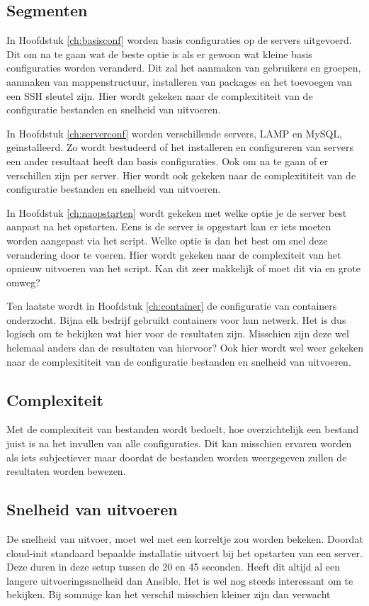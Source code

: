\subsection{Segmenten}
In Hoofdstuk \ref*{ch:basisconf} worden basis configuraties op de servers uitgevoerd. Dit om na te gaan wat de beste optie is als er gewoon wat kleine basis configuraties worden veranderd. Dit zal het aanmaken van gebruikers en groepen, aanmaken van mappenstructuur, installeren van packages en het toevoegen van een SSH sleutel zijn. Hier wordt gekeken naar de complexititeit van de configuratie bestanden en snelheid van uitvoeren.

In Hoofdstuk \ref*{ch:serverconf} worden verschillende servers, LAMP en MySQL, geïnstalleerd. Zo wordt bestudeerd of het installeren en configureren van servers een ander resultaat heeft dan basis configuraties. Ook om na te gaan of er verschillen zijn per server. Hier wordt ook gekeken naar de complexititeit van de configuratie bestanden en snelheid van uitvoeren.

In Hoofdstuk \ref*{ch:naopstarten} wordt gekeken met welke optie je de server best aanpast na het opstarten. Eens is de server is opgestart kan er iets moeten worden aangepast via het script. Welke optie is dan het best om snel deze verandering door te voeren. Hier wordt gekeken naar de complexiteit van het opnieuw uitvoeren van het script. Kan dit zeer makkelijk of moet dit via en grote omweg?

Ten laatste wordt in Hoofdstuk \ref*{ch:container} de configuratie van containers onderzocht. Bijna elk bedrijf gebruikt containers voor hun netwerk. Het is dus logisch om te bekijken wat hier voor de resultaten zijn. Misschien zijn deze wel helemaal anders dan de resultaten van hiervoor? Ook hier wordt wel weer gekeken naar de complexititeit van de configuratie bestanden en snelheid van uitvoeren.

\subsection{Complexiteit}
Met de complexiteit van bestanden wordt bedoelt, hoe overzichtelijk een bestand juist is na het invullen van alle configuraties. Dit kan misschien ervaren worden als iets subjectiever maar doordat de bestanden worden weergegeven zullen de resultaten worden bewezen.

\subsection{Snelheid van uitvoeren}
De snelheid van uitvoer, moet wel met een korreltje zou worden bekeken. Doordat cloud-init standaard bepaalde installatie uitvoert bij het opstarten van een server. Deze duren in deze setup tussen de 20 en 45 seconden. Heeft dit altijd al een langere uitvoeringssnelheid dan Ansible. Het is wel nog steeds interessant om te bekijken. Bij sommige kan het verschil misschien kleiner zijn dan verwacht


